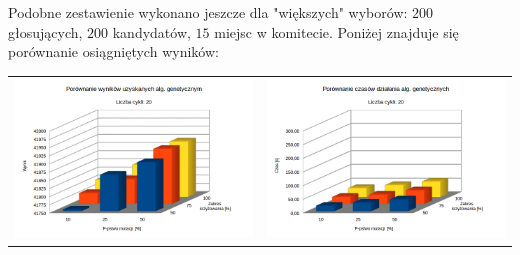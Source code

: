 \documentclass[pdflatex,11pt]{../aghdoc_version2}
\begin{document}
\newpage

Podobne zestawienie wykonano jeszcze dla "większych" wyborów: $200$ głosujących, $200$ kandydatów, $15$ miejsc w komitecie. Poniżej znajduje się porównanie osiągniętych wyników:

\begin{tabular}{cc}
	
\includegraphics[width=0.4\paperwidth]{pics/porownanie2/wynik20.png} & 
\includegraphics[width=0.4\paperwidth]{pics/porownanie2/czas20.png} \\
	

\end{tabular}
\end{document}
